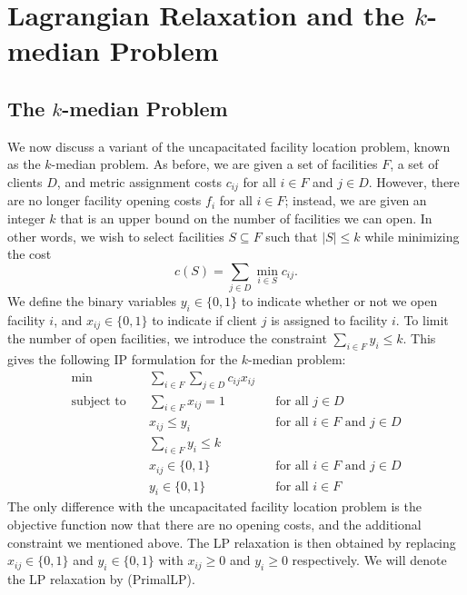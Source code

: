 \section{Lagrangian Relaxation and the $k$-median Problem} \label{sec:9}

\subsection{The $k$-median Problem} \label{subsec:9.1}
We now discuss a variant of the uncapacitated facility location problem, 
known as the $k$-median problem. As before, we are given a set of 
facilities $F$, a set of clients $D$, and metric assignment costs $c_{ij}$ 
for all $i \in F$ and $j \in D$. However, there are no longer 
facility opening costs $f_i$ for all $i \in F$; instead, we are given an integer $k$ 
that is an upper bound on the number of facilities we can open. 
In other words, we wish to select facilities $S \subseteq F$ 
such that $|S| \leq k$ while minimizing the cost 
\[ c(S) = \sum_{j\in D} \min_{i\in S} c_{ij}. \]
We define the binary variables $y_i \in \{0, 1\}$ to indicate whether or 
not we open facility $i$, and $x_{ij} \in \{0, 1\}$ to indicate if 
client $j$ is assigned to facility $i$. To limit the number of open facilities, 
we introduce the constraint $\sum_{i\in F} y_i \leq k$. This gives the 
following IP formulation for the $k$-median problem:
\begin{align*}
    \min\quad & \sum_{i\in F} \sum_{j\in D} c_{ij} x_{ij} \\ 
    \text{subject to}\quad & \sum_{i\in F} x_{ij} = 1
    && \text{for all $j \in D$} \\
    & x_{ij} \leq y_i && \text{for all $i \in F$ and $j \in D$} \\
    & \sum_{i\in F} y_i \leq k \\
    & x_{ij} \in \{0, 1\} && \text{for all $i \in F$ and $j \in D$} \\ 
    & y_i \in \{0, 1\} && \text{for all $i \in F$}
\end{align*}
The only difference with the uncapacitated facility location problem 
is the objective function now that there are no opening costs, 
and the additional constraint we mentioned above. The LP relaxation is then 
obtained by replacing $x_{ij} \in \{0, 1\}$ and $y_i \in \{0, 1\}$ 
with $x_{ij} \geq 0$ and $y_i \geq 0$ respectively. We will denote the 
LP relaxation by (PrimalLP).

